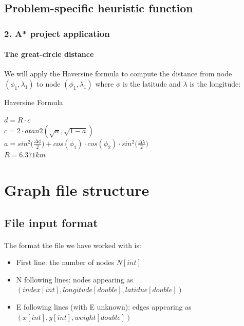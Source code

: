 \documentclass[12pt]{beamer}
\begin{document}
	\subsection{Problem-specific heuristic function}
	\begin{frame}{\secname}
		\frametitle{2. A* project application}
		\framesubtitle{The great-circle distance}
		We will apply the Haversine formula to compute the distance from node $(\phi_1,\lambda_1)$
		to node $(\phi_1,\lambda_1)$ where $\phi$ is the latitude and $\lambda$ is the longitude:
		
		\begin{block}{Haversine Formula}
			\begin{center}
				$d = R \cdot c$\\
				$c = 2 \cdot atan2(\sqrt{a},\sqrt{1-a})$\\
				$a = sin^2\Big({\frac{\Delta \phi}{2}}\Big) + cos(\phi_1) \cdot cos(\phi_2) \cdot sin^2\Big({\frac{\Delta \lambda}{2}}\Big)$
				\\$R=6.371km$
			\end{center}
		\end{block}
	\end{frame}
	\section{Graph file structure}
	\subsection{File input format}
	\begin{frame}{\secname}
		\framesubtitle{\subsecname}
		The format the file we have worked with is:
		\begin{itemize}
			\item First line: the number of nodes $N[int]$
			\item N following lines: nodes appearing as $(index[int], longitude[double], latidue[double])$
			\item E following lines (with E unknown): edges appearing as $(x[int], y[int], weight[double])$
		\end{itemize}
	\end{frame}
\end{document}
